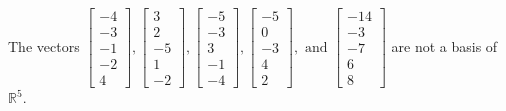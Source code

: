 \begin{exercise}
\begin{exerciseStatement}
  \end{exerciseStatement}
  \begin{exerciseAnswer}
   The vectors \(\left[\begin{array}{r}
-4 \\
-3 \\
-1 \\
-2 \\
4
\end{array}\right] , \left[\begin{array}{r}
3 \\
2 \\
-5 \\
1 \\
-2
\end{array}\right] , \left[\begin{array}{r}
-5 \\
-3 \\
3 \\
-1 \\
-4
\end{array}\right] , \left[\begin{array}{r}
-5 \\
0 \\
-3 \\
4 \\
2
\end{array}\right] , \text{ and } \left[\begin{array}{r}
-14 \\
-3 \\
-7 \\
6 \\
8
\end{array}\right]\) 
  	 are not  a basis of \(\mathbb{R}^5\).
  


  \end{exerciseAnswer}
\end{exercise}
